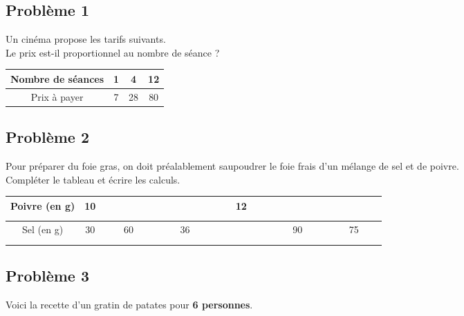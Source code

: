 \subsection*{Problème 1}

\begin{multicols}{2}\noindent

Un cinéma propose les tarifs suivants. \\
Le prix est-il proportionnel au nombre de séance ?


\begin{center}\begin{tabular}{|c|c|c|c|} \hline
  Nombre de séances & 1 &  4 & 12 \\  \hline
  Prix à payer      & 7 & 28 & 80\\  \hline
\end{tabular}\end{center}  \columnbreak 

\Pointilles[5] 

\end{multicols}

\subsection*{Problème 2}

Pour préparer du foie gras, on doit préalablement saupoudrer le foie frais d'un mélange de sel et de poivre. \\
Compléter le tableau et écrire les calculs.

\begin{center}\begin{tabular}{|c|c|c|c|c|c|c|} \hline
  Poivre (en g) & 10 &  $\phantom{\dfrac{azertyuiop}{O}}$  &   $\phantom{\dfrac{azertyuiop}{O}}$ & 12 &  $\phantom{\dfrac{azertyuiop}{O}}$  &  $\phantom{\dfrac{azertyuiop}{O}}$  \\  \hline
  Sel (en g)    & 30 & 60 & 36 &  $\phantom{\dfrac{azertyuiop}{O}}$  & 90 & 75 \\  \hline
\end{tabular}\end{center}

\Pointilles[5] 

\subsection*{Problème 3}

Voici la recette d'un gratin de patates pour \textbf{6 personnes}. 

